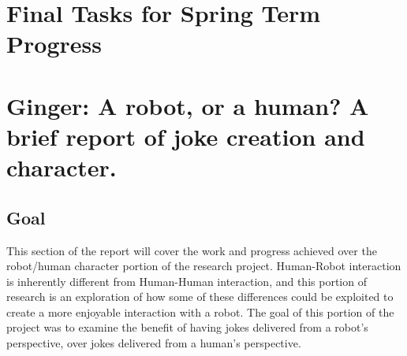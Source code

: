 \documentclass[onecolumn, draftclsnofoot,10pt, compsoc]{IEEEtran}
\begin{document}
\section{Final Tasks for Spring Term Progress}







\section{Ginger: A robot, or a human? A brief report of joke creation and character.}
\subsection{Goal}
This section of the report will cover the work and progress achieved over the robot/human character portion of the research project. Human-Robot interaction is inherently different from Human-Human interaction, and this portion of research is an exploration of how some of these differences could be exploited to create a more enjoyable interaction with a robot. The goal of this portion of the project was to examine the benefit of having jokes delivered from a robot's perspective, over jokes delivered from a human's perspective.
\end{document}
